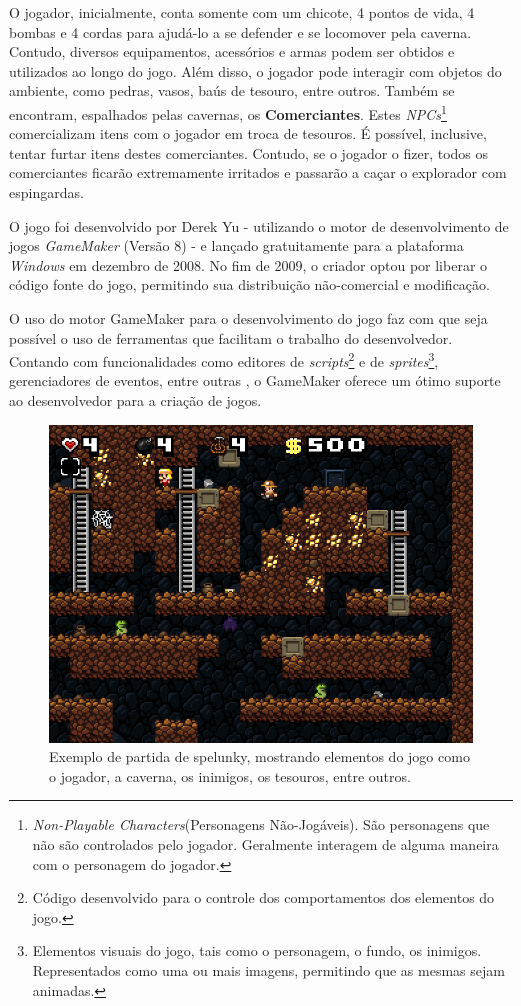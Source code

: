 O jogador, inicialmente, conta somente com um chicote, 4 pontos de vida, 4
bombas e 4 cordas para ajudá-lo a se defender e se locomover pela caverna.
Contudo, diversos equipamentos, acessórios e armas podem ser obtidos e
utilizados ao longo do jogo. Além disso, o jogador pode interagir com objetos do
ambiente, como pedras, vasos, baús de tesouro, entre outros. Também se
encontram, espalhados pelas cavernas, os \textbf{Comerciantes}. Estes
\textit{NPCs}\footnote{\textit{Non-Playable Characters}(Personagens
Não-Jogáveis). São personagens que não são controlados pelo jogador. Geralmente
interagem de alguma maneira com o personagem do jogador.} comercializam itens
com o jogador em troca de tesouros. É possível, inclusive, tentar furtar itens
destes comerciantes. Contudo, se o jogador o fizer, todos os comerciantes
ficarão extremamente irritados e passarão a caçar o explorador com espingardas.

O jogo foi desenvolvido por Derek Yu - utilizando o motor de desenvolvimento de
jogos \textit{GameMaker} (Versão 8) - e lançado gratuitamente para a plataforma
\textit{Windows} em dezembro de 2008\cite{SPELUNKYRELEASE}. No fim de 2009, o
criador optou por liberar o código fonte do jogo, permitindo sua distribuição
não-comercial e modificação\cite{SPELUNKYLICENSE}.

O uso do motor GameMaker para o desenvolvimento do jogo faz com que seja
possível o uso de ferramentas que facilitam o trabalho do desenvolvedor.
Contando com funcionalidades como editores de \textit{scripts}\footnote{Código
desenvolvido para o controle dos comportamentos dos elementos do jogo.} e de
\textit{sprites}\footnote{Elementos visuais do jogo, tais como o personagem, o
fundo, os inimigos. Representados como uma ou mais imagens, permitindo que as
mesmas sejam animadas.}, gerenciadores de eventos, entre outras
\cite{GMAKER8DOCS}, o GameMaker oferece um ótimo suporte ao desenvolvedor para a
criação de jogos.

\begin{figure}[htb!]
\centering\includegraphics[width=.65\textwidth]{fig/spelunky-pc-screen.png}
\caption {\label{fig:spelunky-gameplay}Exemplo de partida de spelunky, mostrando
elementos do jogo como o jogador, a caverna, os inimigos, os tesouros, entre
outros.} \end{figure}



